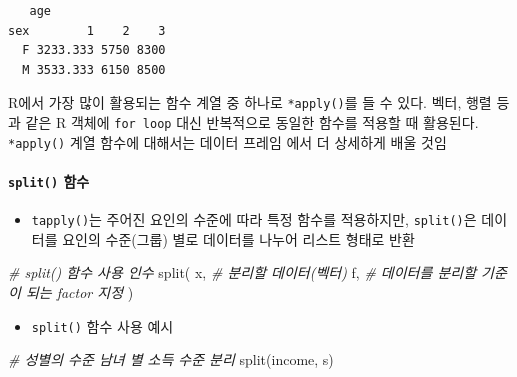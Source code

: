 \documentclass[
  11pt,
]{krantz}
\makeatletter
\newenvironment{Shaded}{\begin{snugshade}}{\end{snugshade}}
\newcommand{\CommentTok}[1]{\textcolor[rgb]{0.37,0.37,0.37}{\textit{#1}}}
\newcommand{\FunctionTok}[1]{\textcolor[rgb]{0,0,0}{#1}}
\newcommand{\NormalTok}[1]{#1}
\providecommand{\tightlist}{%
  \setlength{\itemsep}{0pt}\setlength{\parskip}{0pt}}
\newenvironment{kframe}{%
\medskip{}
\setlength{\fboxsep}{.8em}
 \def\at@end@of@kframe{}%
 \ifinner\ifhmode%
  \def\at@end@of@kframe{\end{minipage}}%
  \begin{minipage}{\columnwidth}%
 \fi\fi%
 \def\FrameCommand##1{\hskip\@totalleftmargin \hskip-\fboxsep
 \colorbox{shadecolor}{##1}\hskip-\fboxsep
     \hskip-\linewidth \hskip-\@totalleftmargin \hskip\columnwidth}%
 \MakeFramed {\advance\hsize-\width
   \@totalleftmargin\z@ \linewidth\hsize
   \@setminipage}}%
 {\par\unskip\endMakeFramed%
 \at@end@of@kframe}
\newenvironment{rmdblock}[1]
  {
  \begin{itemize}
  \renewcommand{\labelitemi}{
    \raisebox{-.7\height}[0pt][0pt]{
      {\setkeys{Gin}{width=3em,keepaspectratio}\texttt{[image: images/\#1]}}
    }
  }
  \setlength{\fboxsep}{1em}
  \begin{kframe}
  \item
  }
  {
  \end{kframe}
  \end{itemize}
  }
\newenvironment{rmdnote}
  {\begin{rmdblock}{note}}
  {\end{rmdblock}}
\makeatother
\begin{document}
\begin{verbatim}
   age
sex        1    2    3
  F 3233.333 5750 8300
  M 3533.333 6150 8500
\end{verbatim}

\normalsize

\footnotesize

\begin{rmdnote}
R에서 가장 많이 활용되는 함수 계열 중 하나로 \texttt{*apply()}를 들 수 있다. 벡터, 행렬 등과 같은 R 객체에 \texttt{for\ loop} 대신 반복적으로 동일한 함수를 적용할 때 활용된다. \texttt{*apply()} 계열 함수에 대해서는 데이터 프레임 에서 더 상세하게 배울 것임
\end{rmdnote}

\normalsize

\hypertarget{split}{%
\paragraph*{\texorpdfstring{\texttt{split()} 함수}{split() 함수}}\label{split}}

\begin{itemize}
\tightlist
\item
  \texttt{tapply()}는 주어진 요인의 수준에 따라 특정 함수를 적용하지만, \texttt{split()}은 데이터를 요인의 수준(그룹) 별로 데이터를 나누어 리스트 형태로 반환
\end{itemize}

\footnotesize

\begin{Shaded}
\begin{Highlighting}[]
\CommentTok{\# split() 함수 사용 인수}
\FunctionTok{split}\NormalTok{(}
\NormalTok{  x, }\CommentTok{\# 분리할 데이터(벡터)}
\NormalTok{  f, }\CommentTok{\# 데이터를 분리할 기준이 되는 factor 지정}
\NormalTok{)}
\end{Highlighting}
\end{Shaded}

\normalsize

\begin{itemize}
\tightlist
\item
  \texttt{split()} 함수 사용 예시
\end{itemize}

\footnotesize

\begin{Shaded}
\begin{Highlighting}[]
\CommentTok{\# 성별의 수준 남녀 별 소득 수준 분리}
\FunctionTok{split}\NormalTok{(income, s)}
\end{Highlighting}
\end{Shaded}
\end{document}
